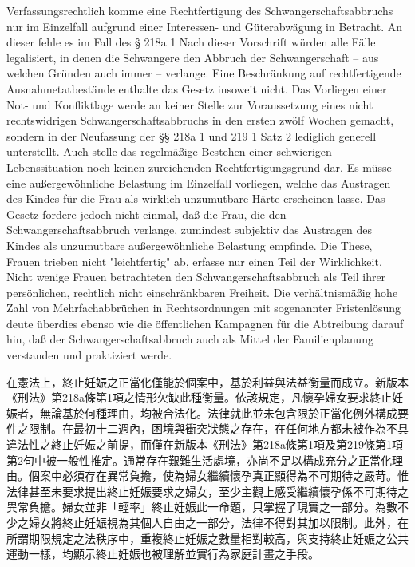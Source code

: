 \documentclass[12pt]{article}
\begin{document}
\begin{sourcepara}[title={原文C.1} Rn 116]
Verfassungsrechtlich komme eine Rechtfertigung des Schwangerschaftsabbruchs nur im Einzelfall aufgrund einer Interessen- und Güterabwägung in Betracht. An dieser fehle es im Fall des § 218a \abbrAbs{} 1 \abbrStGB{} \abbrNF{} Nach dieser Vorschrift würden alle Fälle legalisiert, in denen die Schwangere den Abbruch der Schwangerschaft -- aus welchen Gründen auch immer -- verlange. Eine Beschränkung auf rechtfertigende Ausnahmetatbestände enthalte das Gesetz insoweit nicht. Das Vorliegen einer Not- und Konfliktlage werde an keiner Stelle zur Voraussetzung eines nicht rechtswidrigen Schwangerschaftsabbruchs in den ersten zwölf Wochen gemacht, sondern in der Neufassung der §§ 218a \abbrAbs{} 1 und 219 \abbrAbs{} 1 Satz 2 \abbrStGB{} lediglich generell unterstellt. Auch stelle das regelmäßige Bestehen einer schwierigen Lebenssituation noch keinen zureichenden Rechtfertigungsgrund dar. Es müsse eine außergewöhnliche Belastung im Einzelfall vorliegen, welche das Austragen des Kindes für die Frau als wirklich unzumutbare Härte erscheinen lasse. Das Gesetz fordere jedoch nicht einmal, daß die Frau, die den Schwangerschaftsabbruch verlange, zumindest subjektiv das Austragen des Kindes als unzumutbare außergewöhnliche Belastung empfinde. Die These, Frauen trieben nicht "leichtfertig" ab, erfasse nur einen Teil der Wirklichkeit. Nicht wenige Frauen betrachteten den Schwangerschaftsabbruch als Teil ihrer persönlichen, rechtlich nicht einschränkbaren Freiheit. Die verhältnismäßig hohe Zahl von Mehrfachabbrüchen in Rechtsordnungen mit sogenannter Fristenlösung deute überdies ebenso wie die öffentlichen Kampagnen für die Abtreibung darauf hin, daß der Schwangerschaftsabbruch auch als Mittel der Familienplanung verstanden und praktiziert werde.
\end{sourcepara}
\begin{transpara}
在憲法上，終止妊娠之正當化僅能於個案中，基於利益與法益衡量而成立。新版本《刑法》第218a條第1項之情形欠缺此種衡量。依該規定，凡懷孕婦女要求終止妊娠者，無論基於何種理由，均被合法化。法律就此並未包含限於正當化例外構成要件之限制。在最初十二週內，困境與衝突狀態之存在，在任何地方都未被作為不具違法性之終止妊娠之前提，而僅在新版本《刑法》第218a條第1項及第219條第1項第2句中被一般性推定。通常存在艱難生活處境，亦尚不足以構成充分之正當化理由。個案中必須存在異常負擔，使為婦女繼續懷孕真正顯得為不可期待之嚴苛。惟法律甚至未要求提出終止妊娠要求之婦女，至少主觀上感受繼續懷孕係不可期待之異常負擔。婦女並非「輕率」終止妊娠此一命題，只掌握了現實之一部分。為數不少之婦女將終止妊娠視為其個人自由之一部分，法律不得對其加以限制。此外，在所謂期限規定之法秩序中，重複終止妊娠之數量相對較高，與支持終止妊娠之公共運動一樣，均顯示終止妊娠也被理解並實行為家庭計畫之手段。
\end{transpara}
\end{document}
